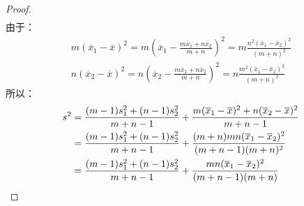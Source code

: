 \begin{proof}
\begin{align*}
	\end{align*}
	由于：
	\begin{gather*}
		m(\overline{x}_1-\overline{x})^2=m\left(\overline{x}_1-\frac{m\overline{x}_1+n\overline{x}_2}{m+n}\right)^2=m\frac{n^2(\overline{x}_1-\overline{x}_2)^2}{(m+n)^2} \\
		n(\overline{x}_2-\overline{x})^2=n\left(\overline{x}_2-\frac{m\overline{x}_1+n\overline{x}_2}{m+n}\right)^2=n\frac{m^2(\overline{x}_1-\overline{x}_2)^2}{(m+n)^2}
	\end{gather*}
	所以：
	\begin{align*}
		s^2&=\frac{(m-1)s_1^2+(n-1)s_2^2}{m+n-1}+\frac{m(\overline{x}_1-\overline{x})^2+n(\overline{x}_2-\overline{x})^2}{m+n-1} \\
		&=\frac{(m-1)s_1^2+(n-1)s_2^2}{m+n-1}+\frac{(m+n)mn(\overline{x}_1-\overline{x}_2)^2}{(m+n-1)(m+n)^2} \\
		&=\frac{(m-1)s_1^2+(n-1)s_2^2}{m+n-1}+\frac{mn(\overline{x}_1-\overline{x}_2)^2}{(m+n-1)(m+n)}\qedhere
	\end{align*}
\end{proof}

